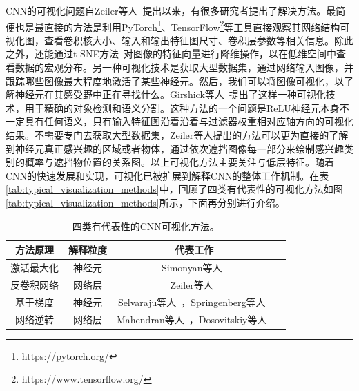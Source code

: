 CNN的可视化问题自Zeiler等人~\cite{zeiler2014visualizing}提出以来，有很多研究者提出了解决方法。最简便也是最直接的方法是利用PyTorch\footnote{https://pytorch.org/}、TensorFlow\footnote{https://www.tensorflow.org/}等工具直接观察其网络结构可视化图，查看卷积核大小、输入和输出特征图尺寸、卷积层参数等相关信息。除此之外，还能通过t-SNE方法~\cite{maaten2008visualizing}对图像的特征向量进行降维操作，以在低维空间中查看数据的宏观分布。另一种可视化技术是获取大型数据集，通过网络输入图像，并跟踪哪些图像最大程度地激活了某些神经元。然后，我们可以将图像可视化，以了解神经元在其感受野中正在寻找什么。Girshick等人~\cite{girshick2014rich}提出了这样一种可视化技术，用于精确的对象检测和语义分割。这种方法的一个问题是ReLU神经元本身不一定具有任何语义，只有输入特征图沿着沿着与过滤器权重相对应轴方向的可视化结果。不需要专门去获取大型数据集，Zeiler等人提出的方法可以更为直接的了解到神经元真正感兴趣的区域或者物体，通过依次遮挡图像每一部分来绘制感兴趣类别的概率与遮挡物位置的关系图。以上可视化方法主要关注与低层特征。随着CNN的快速发展和实现，可视化已被扩展到解释CNN的整体工作机制。在表\ref{tab:typical_visualization_methods}中，回顾了四类有代表性的可视化方法如图\ref{tab:typical_visualization_methods}所示，下面再分别进行介绍。
\begin{table}[h]
	\centering
	\caption{四类有代表性的CNN可视化方法。}		
	\label{tab:typical_visualization_methods}
	\begin{tabular}{c|c|c|c}
		\toprule[2pt]
		方法原理 & 解释粒度 & 代表工作 \\
		\midrule[2pt]
		激活最大化 & 神经元  & Simonyan等人~\cite{simonyan2013deep}  \\\hline
		反卷积网络 & 网络层  & Zeiler等人~\cite{zeiler2014visualizing, zeiler2010deconvolutional, zeiler2011adaptive} \\\hline
		基于梯度 &  神经元 & Selvaraju等人~\cite{selvaraju2017grad}，Springenberg等人~\cite{springenberg2014striving} \\  \hline
		网络逆转 & 网络层 &Mahendran等人~\cite{mahendran2015understanding, mahendran2016visualizing}，Dosovitskiy等人~\cite{dosovitskiy2016inverting}\\
		\bottomrule[2pt]
	\end{tabular}
	\label{tab:four_visulization_types}
\end{table}
